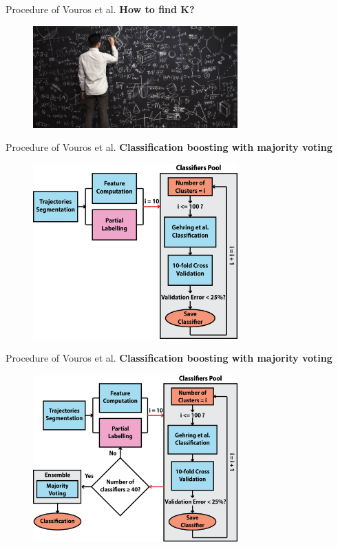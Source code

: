 \documentclass{beamer}
\begin{document}
{\begin{frame}{Procedure of Vouros et al.}
	\textbf{How to find K?}
	\vspace{7mm}
	\begin{figure}[H]
		\centering
		\includegraphics[width=0.7\textwidth]{figures/maths}
	\end{figure}
	\vspace{20mm}
\end{frame}

\begin{frame}{Procedure of Vouros et al.}
	\textbf{Classification boosting with majority voting}
	\vspace{1mm}
	\begin{figure}[H]
		\centering
		\includegraphics[width=0.7\textwidth]{figures/boosting1}
	\end{figure}
\end{frame}
\begin{frame}{Procedure of Vouros et al.}
	\textbf{Classification boosting with majority voting}
	\vspace{1mm}
	\begin{figure}[H]
		\centering
		\includegraphics[width=0.7\textwidth]{figures/boosting2}
	\end{figure}
\end{frame}

}
\end{document}
